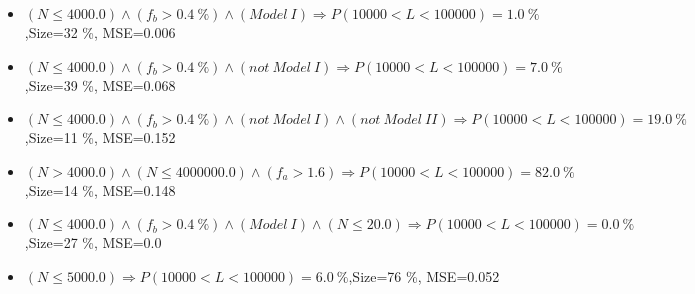 \documentclass[numbered]{CSL}
\begin{document}
\begin{itemize}
\item $(N \leq 4000.0) \land (f_b > 0.4~\%) \land (Model~I) \Rightarrow P(10 000 < L < 100 000) = 1.0~\%$,\hfill Size=32 \%, MSE=0.006
\item $(N \leq 4000.0) \land (f_b > 0.4~\%) \land (not~Model~I) \Rightarrow P(10 000 < L < 100 000) = 7.0~\%$,\hfill Size=39 \%, MSE=0.068
\item $(N \leq 4000.0) \land (f_b > 0.4~\%) \land (not~Model~I) \land (not~Model~II) \Rightarrow P(10 000 < L < 100 000) = 19.0~\%$,\hfill Size=11 \%, MSE=0.152
\item $(N > 4000.0) \land (N \leq 4000000.0) \land (f_a > 1.6) \Rightarrow P(10 000 < L < 100 000) = 82.0~\%$,\hfill Size=14 \%, MSE=0.148
\item $(N \leq 4000.0) \land (f_b > 0.4~\%) \land (Model~I) \land (N \leq 20.0) \Rightarrow P(10 000 < L < 100 000) = 0.0~\%$,\hfill Size=27 \%, MSE=0.0
\item $(N \leq 5000.0) \Rightarrow P(10 000 < L < 100 000) = 6.0~\%$,\hfill Size=76 \%, MSE=0.052
\end{itemize}
\end{document}
